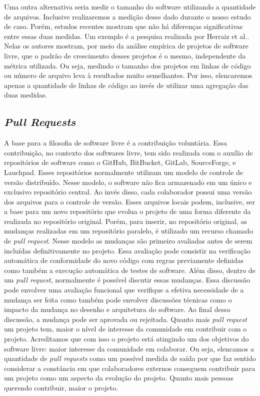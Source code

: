 Uma outra alternativa seria medir o tamanho do software utilizando a quantidade de arquivos. Inclusive realizaremos a medição desse dado durante o nosso estudo de caso. Porém, estudos recentes mostram que não há diferenças significativas entre essas duas medidas. Um exemplo é a pesquisa realizada por Herraiz et al.\cite{herraiz2006comparison}. Nelas os autores mostram, por meio da análise empírica de projetos de software livre, que o padrão de crescimento desses projetos é o mesmo, independente da métrica utilizada. Ou seja, medindo o tamanho dos projetos em linhas de código ou número de arquivo leva à resultados muito semelhantes. Por isso, elencaremos apenas a quantidade de linhas de código ao invés de utilizar uma agregação das duas medidas.



\subsection{\textit{Pull Requests}}

A base para a filosofia de software livre é a contribuição voluntária. Essa contribuição, no contexto dos softwares livre, tem sido realizada com o auxílio de repositórios de software como o GitHub, BitBucket, GitLab, SourceForge, e Lauchpad. Esses repositórios normalmente utilizam um modelo de controle de versão distribuído. Nesse modelo, o software não fica armazenado em um único e exclusivo repositório central. Ao invés disso, cada colaborador possui uma versão dos arquivos para o controle de versão. Esses arquivos locais podem, inclusive, ser a base para um novo repositório que evolua o projeto de uma forma diferente da realizada no repositório original. Porém, para inserir, no repositório original, as mudanças realizadas em um repositório paralelo, é utilizado um recurso chamado de \textit{pull request}. Nesse modelo as mudanças são primeiro avaliadas antes de serem incluídas definitivamente no projeto. Essa avaliação pode consistir na verificação automática de conformidade do novo código com regras previamente definidas como também a execução automática de testes de software. Além disso, dentro de um \textit{pull request}, normalmente é possível discutir essas mudanças. Essa discussão pode envolver uma avaliação funcional que verifique a efetiva necessidade de a mudança ser feita como também pode envolver discussões técnicas como o impacto da mudança no desenho e arquitetura do software.  Ao final dessa discussão, a mudança pode ser aprovada ou rejeitada.  Quanto mais \textit{pull request} um projeto tem, maior o nível de interesse da comunidade em contribuir com o projeto. Acreditamos que com isso o projeto está atingindo um dos objetivos do software livre: maior interesse da comunidade em colaborar. Ou seja, elencamos a quantidade de \textit{pull requests} como um possível medida de saída por  que faz sentido considerar a constância em que colaboradores externos conseguem contribuir para um projeto como um aspecto da evolução do projeto. Quanto mais pessoas querendo contribuir, maior o projeto.

